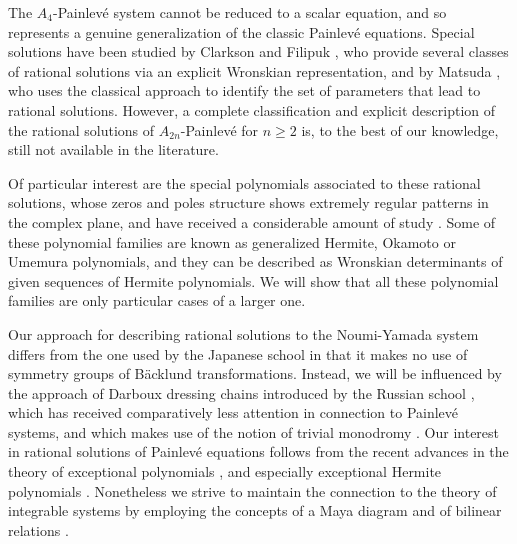 \documentclass{amsart}
\theoremstyle{definition}
\begin{document}
The $A_4$-Painlev\'e system cannot be reduced to a scalar equation,
and so represents a genuine generalization of the classic Painlev\'e
equations.  Special solutions have been studied by Clarkson and
Filipuk \cite{filipuk2008symmetric}, who provide several classes of
rational solutions via an explicit Wronskian representation, and by
Matsuda \cite{matsuda2012rational}, who uses the classical approach to
identify the set of parameters that lead to rational
solutions. However, a complete classification and explicit description
of the rational solutions of $A_{2n}$-Painlev\'e for $n\geq2$ is, to
the best of our knowledge, still not available in the literature.

Of particular interest are the special polynomials associated to these
rational solutions, whose zeros and poles structure shows extremely
regular patterns in the complex plane, and have received a
considerable amount of study
\cite{okamoto1987studies3,noumi1999symmetries,umemura1997solutions,
  fukutani2000special,clarkson2006special}. Some of these polynomial
families are known as generalized Hermite, Okamoto or Umemura
polynomials, and they can be described as Wronskian determinants of
given sequences of Hermite polynomials. We will show that all these
polynomial families are only particular cases of a larger one.

Our approach for describing rational solutions to the Noumi-Yamada
system differs from the one used by the Japanese school in that it
makes no use of symmetry groups of B\"acklund
transformations. Instead, we will be influenced by the approach of
Darboux dressing chains introduced by the Russian school
\cite{adler1994nonlinear,veselov1993dressing}, which has received
comparatively less attention in connection to Painlev\'e systems, and
which makes use of the notion of trivial monodromy
\cite{oblomkov1999monodromy}.  Our interest in rational solutions of
Painlev\'e equations follows from the recent advances in the theory of
exceptional polynomials
\cite{gomez2009extended,gomez2010extension,gomez2018durfee}, and
especially exceptional Hermite polynomials \cite{gomez2013rational}.
Nonetheless we strive to maintain the connection to the theory of
integrable systems by employing the concepts of a Maya diagram and of
bilinear relations \cite{miwa2000solitons}.
\end{document}
